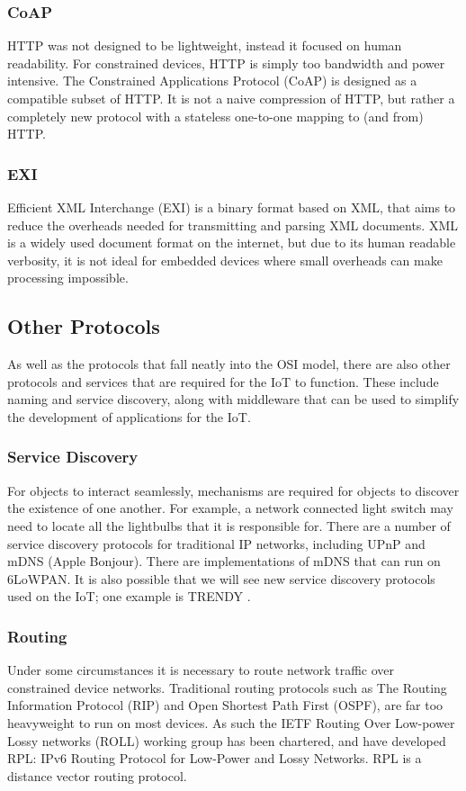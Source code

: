 \documentclass[10pt,journal,compsoc]{IEEEtran}
\begin{document}
\subsubsection{CoAP}
HTTP was not designed to be lightweight, instead it focused on human
readability. For constrained devices, HTTP is simply too bandwidth and power
intensive. The Constrained Applications Protocol (CoAP) is designed as a
compatible subset of HTTP. It is not a naive compression of HTTP, but rather a
completely new protocol with a stateless one-to-one mapping to (and from) HTTP. 

\subsubsection{EXI}
Efficient XML Interchange (EXI) is a binary format based on XML, that aims to
reduce the overheads needed for transmitting and parsing XML documents. XML is
a widely used document format on the internet, but due to its human readable
verbosity, it is not ideal for embedded devices where small overheads can make
processing impossible. 

\subsection{Other Protocols}
As well as the protocols that fall neatly into the OSI model, there are also
other protocols and services that are required for the IoT to function. These
include naming and service discovery, along with middleware that can be used to
simplify the development of applications for the IoT.

\subsubsection{Service Discovery}
For objects to interact seamlessly, mechanisms are required for objects to
discover the existence of one another. For example, a network connected light
switch may need to locate all the lightbulbs that it is responsible for. There
are a number of service discovery protocols for traditional IP networks,
including UPnP and mDNS (Apple Bonjour). There are implementations of mDNS
that can run on 6LoWPAN. It is also possible that we will see new service
discovery protocols used on the IoT; one example is TRENDY \cite{Butt2013}. 

\subsubsection{Routing}
Under some circumstances it is necessary to route network traffic over
constrained device networks. Traditional routing protocols such as The Routing
Information Protocol (RIP) and Open Shortest Path First (OSPF), are far too
heavyweight to run on most devices. As such the IETF Routing Over Low-power
Lossy networks (ROLL) working group has been chartered, and have developed RPL:
IPv6 Routing Protocol for Low-Power and Lossy Networks. RPL is a distance
vector routing protocol.   
\end{document}
